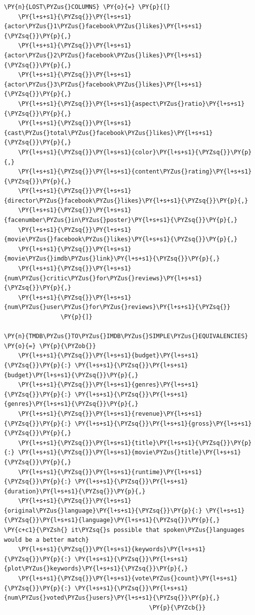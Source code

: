     \begin{tcolorbox}[breakable, size=fbox, boxrule=1pt, pad at break*=1mm,colback=cellbackground, colframe=cellborder]
\begin{Verbatim}[commandchars=\\\{\}]
\PY{n}{LOST\PYZus{}COLUMNS} \PY{o}{=} \PY{p}{[}
    \PY{l+s+s1}{\PYZsq{}}\PY{l+s+s1}{actor\PYZus{}1\PYZus{}facebook\PYZus{}likes}\PY{l+s+s1}{\PYZsq{}}\PY{p}{,}
    \PY{l+s+s1}{\PYZsq{}}\PY{l+s+s1}{actor\PYZus{}2\PYZus{}facebook\PYZus{}likes}\PY{l+s+s1}{\PYZsq{}}\PY{p}{,}
    \PY{l+s+s1}{\PYZsq{}}\PY{l+s+s1}{actor\PYZus{}3\PYZus{}facebook\PYZus{}likes}\PY{l+s+s1}{\PYZsq{}}\PY{p}{,}
    \PY{l+s+s1}{\PYZsq{}}\PY{l+s+s1}{aspect\PYZus{}ratio}\PY{l+s+s1}{\PYZsq{}}\PY{p}{,}
    \PY{l+s+s1}{\PYZsq{}}\PY{l+s+s1}{cast\PYZus{}total\PYZus{}facebook\PYZus{}likes}\PY{l+s+s1}{\PYZsq{}}\PY{p}{,}
    \PY{l+s+s1}{\PYZsq{}}\PY{l+s+s1}{color}\PY{l+s+s1}{\PYZsq{}}\PY{p}{,}
    \PY{l+s+s1}{\PYZsq{}}\PY{l+s+s1}{content\PYZus{}rating}\PY{l+s+s1}{\PYZsq{}}\PY{p}{,}
    \PY{l+s+s1}{\PYZsq{}}\PY{l+s+s1}{director\PYZus{}facebook\PYZus{}likes}\PY{l+s+s1}{\PYZsq{}}\PY{p}{,}
    \PY{l+s+s1}{\PYZsq{}}\PY{l+s+s1}{facenumber\PYZus{}in\PYZus{}poster}\PY{l+s+s1}{\PYZsq{}}\PY{p}{,}
    \PY{l+s+s1}{\PYZsq{}}\PY{l+s+s1}{movie\PYZus{}facebook\PYZus{}likes}\PY{l+s+s1}{\PYZsq{}}\PY{p}{,}
    \PY{l+s+s1}{\PYZsq{}}\PY{l+s+s1}{movie\PYZus{}imdb\PYZus{}link}\PY{l+s+s1}{\PYZsq{}}\PY{p}{,}
    \PY{l+s+s1}{\PYZsq{}}\PY{l+s+s1}{num\PYZus{}critic\PYZus{}for\PYZus{}reviews}\PY{l+s+s1}{\PYZsq{}}\PY{p}{,}
    \PY{l+s+s1}{\PYZsq{}}\PY{l+s+s1}{num\PYZus{}user\PYZus{}for\PYZus{}reviews}\PY{l+s+s1}{\PYZsq{}}
                \PY{p}{]}

\PY{n}{TMDB\PYZus{}TO\PYZus{}IMDB\PYZus{}SIMPLE\PYZus{}EQUIVALENCIES} \PY{o}{=} \PY{p}{\PYZob{}}
    \PY{l+s+s1}{\PYZsq{}}\PY{l+s+s1}{budget}\PY{l+s+s1}{\PYZsq{}}\PY{p}{:} \PY{l+s+s1}{\PYZsq{}}\PY{l+s+s1}{budget}\PY{l+s+s1}{\PYZsq{}}\PY{p}{,}
    \PY{l+s+s1}{\PYZsq{}}\PY{l+s+s1}{genres}\PY{l+s+s1}{\PYZsq{}}\PY{p}{:} \PY{l+s+s1}{\PYZsq{}}\PY{l+s+s1}{genres}\PY{l+s+s1}{\PYZsq{}}\PY{p}{,}
    \PY{l+s+s1}{\PYZsq{}}\PY{l+s+s1}{revenue}\PY{l+s+s1}{\PYZsq{}}\PY{p}{:} \PY{l+s+s1}{\PYZsq{}}\PY{l+s+s1}{gross}\PY{l+s+s1}{\PYZsq{}}\PY{p}{,}
    \PY{l+s+s1}{\PYZsq{}}\PY{l+s+s1}{title}\PY{l+s+s1}{\PYZsq{}}\PY{p}{:} \PY{l+s+s1}{\PYZsq{}}\PY{l+s+s1}{movie\PYZus{}title}\PY{l+s+s1}{\PYZsq{}}\PY{p}{,}
    \PY{l+s+s1}{\PYZsq{}}\PY{l+s+s1}{runtime}\PY{l+s+s1}{\PYZsq{}}\PY{p}{:} \PY{l+s+s1}{\PYZsq{}}\PY{l+s+s1}{duration}\PY{l+s+s1}{\PYZsq{}}\PY{p}{,}
    \PY{l+s+s1}{\PYZsq{}}\PY{l+s+s1}{original\PYZus{}language}\PY{l+s+s1}{\PYZsq{}}\PY{p}{:} \PY{l+s+s1}{\PYZsq{}}\PY{l+s+s1}{language}\PY{l+s+s1}{\PYZsq{}}\PY{p}{,}  \PY{c+c1}{\PYZsh{} it\PYZsq{}s possible that spoken\PYZus{}languages would be a better match}
    \PY{l+s+s1}{\PYZsq{}}\PY{l+s+s1}{keywords}\PY{l+s+s1}{\PYZsq{}}\PY{p}{:} \PY{l+s+s1}{\PYZsq{}}\PY{l+s+s1}{plot\PYZus{}keywords}\PY{l+s+s1}{\PYZsq{}}\PY{p}{,}
    \PY{l+s+s1}{\PYZsq{}}\PY{l+s+s1}{vote\PYZus{}count}\PY{l+s+s1}{\PYZsq{}}\PY{p}{:} \PY{l+s+s1}{\PYZsq{}}\PY{l+s+s1}{num\PYZus{}voted\PYZus{}users}\PY{l+s+s1}{\PYZsq{}}\PY{p}{,}
                                         \PY{p}{\PYZcb{}}


\end{Verbatim}
\end{tcolorbox}
